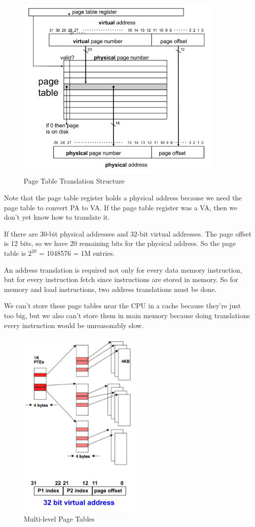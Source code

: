 \documentclass{article}
\begin{document}
\begin{figure}[ht!]
\centering
\includegraphics[width=100mm]{img/ptts.png}
\caption{Page Table Translation Structure}
\end{figure}

Note that the page table register holds a physical address because we need the page table to convert PA to VA. If the page table register was a VA, then we don't yet know how to translate it. 

If there are 30-bit physical addresses and 32-bit virtual addresses. The page offset is 12 bits, so we have 20 remaining bits for the physical address. So the page table is $2^{20}$ = 1048576 = 1M entries. 

An address translation is required not only for every data memory instruction, but for every instruction fetch since instructions are stored in memory. So for memory and load instructions, two address translations must be done.

We can't store these page tables near the CPU in a cache because they're just too big, but we also can't store them in main memory because doing translations every instruction would be unreasonably slow. 

\begin{figure}[ht!]
\centering
\includegraphics[width=60mm]{img/sparse.png}
\caption{Multi-level Page Tables}
\end{figure}
\end{document}
